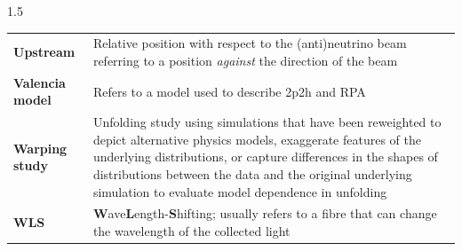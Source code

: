 \begin{spacing}{1.5}
\begin{longtable}[l]{p{} p{}}
        \textbf{Upstream} &  Relative position with respect to the (anti)neutrino beam referring to a position \textit{against} the direction of the beam \\
        \textbf{Valencia model} & Refers to a model used to describe 2p2h and RPA \\
        \textbf{Warping study} & Unfolding study using simulations that have been reweighted to depict alternative physics models, exaggerate features of the underlying distributions, or capture differences in the shapes of distributions between the data and the original underlying simulation to evaluate model dependence in unfolding \\
        \textbf{WLS} & \textbf{W}ave\textbf{L}ength-\textbf{S}hifting; usually refers to a fibre that can change the wavelength of the collected light \\
\end{longtable}
\end{spacing}
